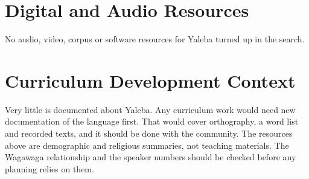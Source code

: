 \documentclass[12pt]{article}
\begin{document}
\section{Digital and Audio Resources}
No audio, video, corpus or software resources for Yaleba turned up in the search.

\section{Curriculum Development Context}
Very little is documented about Yaleba. Any curriculum work would need new documentation of the language first. That would cover orthography, a word list and recorded texts, and it should be done with the community. The resources above are demographic and religious summaries, not teaching materials. The Wagawaga relationship and the speaker numbers should be checked before any planning relies on them.
\end{document}
